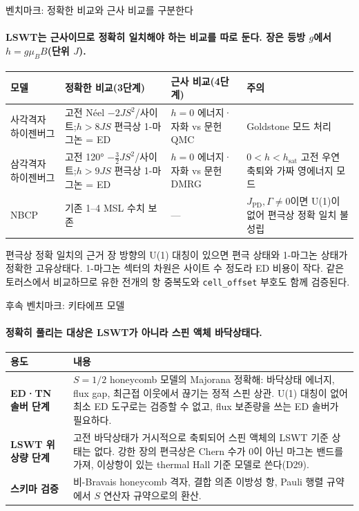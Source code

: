 \begin{frame}[label=benchmarks]{벤치마크: 정확한 비교와 근사 비교를 구분한다}
  \framesubtitle{LSWT는 근사이므로 정확히 일치해야 하는 비교를 따로 둔다. 장은 등방 $g$에서 $h=g\mu_B B$(단위 $J$).}
  \small
  \begin{tabularx}{\textwidth}{@{}P{2.1cm}P{4.4cm}P{3.0cm}Y@{}}
    \toprule
    모델 & 정확한 비교(3단계) & 근사 비교(4단계) & 주의 \\
    \midrule
    사각격자 하이젠버그 & 고전 Néel $-2JS^2$/사이트;\newline $h>8JS$ 편극상 1-마그논 = ED
      & $h=0$ 에너지·자화 vs 문헌 QMC & Goldstone 모드 처리 \\
    삼각격자 하이젠버그 & 고전 120° $-\tfrac32JS^2$/사이트;\newline $h>9JS$ 편극상 1-마그논 = ED
      & $h=0$ 에너지·자화 vs 문헌 DMRG & $0<h<h_{\mathrm{sat}}$ 고전 우연 축퇴와 가짜 영에너지 모드 \\
    NBCP & 기존 1--4 MSL 수치 보존 & — & $J_{\mathrm{PD}},\Gamma\neq0$이면 U(1)이 없어 편극상 정확 일치 불성립 \\
    \bottomrule
  \end{tabularx}
  \par\medskip
  \begin{mdcallout}[result]{편극상 정확 일치의 근거}
    장 방향의 U(1) 대칭이 있으면 편극 상태와 1-마그논 상태가 정확한 고유상태다.
    1-마그논 섹터의 차원은 사이트 수 정도라 ED 비용이 작다. 같은 토러스에서 비교하므로
    유한 전개의 항 중복도와 \texttt{cell\_offset} 부호도 함께 검증된다.
  \end{mdcallout}
\end{frame}

\begin{frame}[label=kitaev-benchmark]{후속 벤치마크: 키타에프 모델}
  \framesubtitle{정확히 풀리는 대상은 LSWT가 아니라 스핀 액체 바닥상태다.}
  \begin{tabularx}{\textwidth}{@{}p{2.8cm}Y@{}}
    \toprule
    용도 & 내용 \\
    \midrule
    \textbf{ED·TN 솔버 단계} & $S=1/2$ honeycomb 모델의 Majorana 정확해: 바닥상태 에너지, flux gap,
      최근접 이웃에서 끊기는 정적 스핀 상관. U(1) 대칭이 없어 최소 ED 도구로는 검증할 수 없고,
      flux 보존량을 쓰는 ED 솔버가 필요하다. \\
    \textbf{LSWT 위상량 단계} & 고전 바닥상태가 거시적으로 축퇴되어 스핀 액체의 LSWT 기준 상태는 없다.
      강한 장의 편극상은 Chern 수가 0이 아닌 마그논 밴드를 가져, 이상항이 있는 thermal Hall 기준 모델로 쓴다(D29). \\
    \textbf{스키마 검증} & 비-Bravais honeycomb 격자, 결합 의존 이방성 항, Pauli 행렬 규약에서 $S$ 연산자 규약으로의 환산. \\
    \bottomrule
  \end{tabularx}
  \par\medskip
\end{frame}

